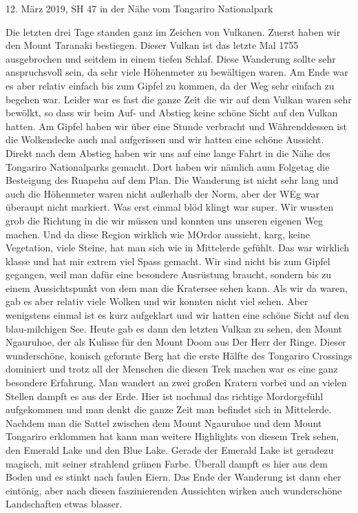 \documentclass[11pt]{book}
\begin{document}
12. März 2019, SH 47 in der Nähe vom Tongariro Nationalpark

Die letzten drei Tage standen ganz im Zeichen von Vulkanen. Zuerst haben wir den Mount Taranaki bestiegen. Dieser Vulkan ist das letzte 
Mal 1755 ausgebrochen und seitdem in einem tiefen Schlaf. Diese Wanderung sollte sehr anspruchsvoll sein, da sehr viele Höhenmeter 
zu bewältigen waren. Am Ende war es aber relativ einfach bis zum Gipfel zu kommen, da der Weg sehr einfach zu begehen war. Leider 
war es fast die ganze Zeit die wir auf dem Vulkan waren sehr bewölkt, so dass wir beim Auf- und Abstieg keine schöne Sicht auf den 
Vulkan hatten. Am Gipfel haben wir über eine Stunde verbracht und Währenddessen ist die Wolkendecke auch mal aufgerissen und wir hatten 
eine schöne Aussicht. Direkt nach dem Abstieg haben wir uns auf eine lange Fahrt in die Nähe des Tongariro Nationalparks gemacht. Dort 
haben wir nämlich aum Folgetag die Besteigung des Ruapehu auf dem Plan. Die Wanderung ist nicht sehr lang und auch die Höhenmeter 
waren nicht außerhalb der Norm, aber der WEg war überaupt nicht markiert. Was erst einmal blöd klingt war super. Wir wussten grob die Richtung 
in die wir müssen und konnten uns unseren eigenen Weg machen. Und da diese Region wirklich wie MOrdor aussieht, karg, keine Vegetation, 
viele Steine, hat man sich wie in Mittelerde gefühlt. Das war wirklich klasse und hat mir extrem viel Spass gemacht. Wir sind nicht 
bis zum Gipfel gegangen, weil man dafür eine besondere Ausrüstung braucht, sondern bis zu einem Aussichtspunkt von dem man die 
Kratersee sehen kann. Als wir da waren, gab es aber relativ viele Wolken und wir konnten nicht viel sehen. Aber wenigstens einmal 
ist es kurz aufgeklart und wir hatten eine schöne Sicht auf den blau-milchigen See. Heute gab es dann den letzten Vulkan zu sehen, 
den Mount Ngauruhoe, der als Kulisse für den Mount Doom aus Der Herr der Ringe. Dieser wunderschöne, konisch geformte Berg hat die 
erste Hälfte des Tongariro Crossings dominiert und trotz all der Menschen die diesen Trek machen war es eine ganz besondere Erfahrung. 
Man wandert an zwei großen Kratern vorbei und an vielen Stellen dampft es aus der Erde. Hier ist nochmal das richtige Mordorgefühl 
aufgekommen und man denkt die ganze Zeit man befindet sich in Mittelerde. Nachdem man die Sattel zwischen dem Mount Ngauruhoe und dem 
Mount Tongariro erklommen hat kann man weitere Highlights von diesem Trek sehen, den Emerald Lake und den Blue Lake. Gerade der 
Emerald Lake ist geradezu magisch, mit seiner strahlend grünen Farbe. Überall dampft es hier aus dem Boden und es stinkt nach faulen 
Eiern. Das Ende der Wanderung ist dann eher eintönig, aber nach diesen faszinierenden Aussichten wirken auch wunderschöne Landschaften 
etwas blasser. 
\end{document}
